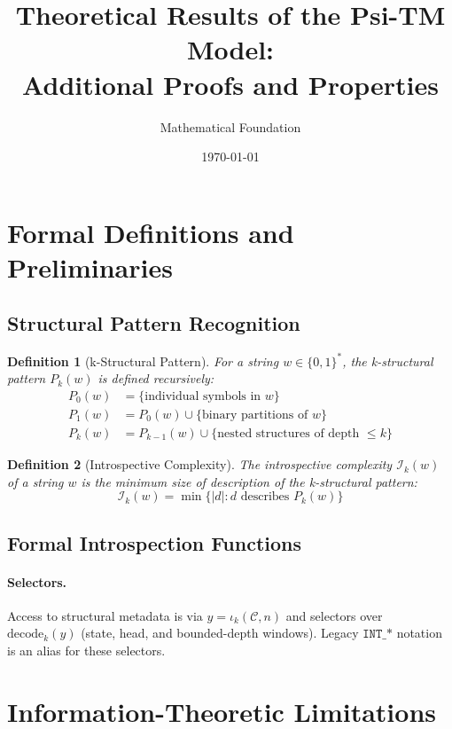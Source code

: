 \documentclass[11pt]{article}
\title{Theoretical Results of the Psi-TM Model:\\
Additional Proofs and Properties}
\author{Mathematical Foundation}
\date{\today}
\newtheorem{definition}{Definition}
\begin{document}
\maketitle

\section{Formal Definitions and Preliminaries}

\subsection{Structural Pattern Recognition}

\begin{definition}[k-Structural Pattern]
For a string $w \in \{0,1\}^*$, the k-structural pattern $P_k(w)$ is defined recursively:
\begin{align*}
P_0(w) &= \{\text{individual symbols in } w\} \\
P_1(w) &= P_0(w) \cup \{\text{binary partitions of } w\} \\
P_k(w) &= P_{k-1}(w) \cup \{\text{nested structures of depth } \leq k\}
\end{align*}
\end{definition}

\begin{definition}[Introspective Complexity]
The introspective complexity $\mathcal{I}_k(w)$ of a string $w$ is the minimum size of description of the k-structural pattern:
$$\mathcal{I}_k(w) = \min\{|d| : d \text{ describes } P_k(w)\}$$
\end{definition}

\subsection{Formal Introspection Functions}

\paragraph{Selectors.} Access to structural metadata is via $y=\iota_k(\mathcal{C},n)$ and selectors over $\mathrm{decode}_k(y)$ (state, head, and bounded-depth windows). Legacy $\texttt{INT\_*}$ notation is an alias for these selectors.

\section{Information-Theoretic Limitations}
\end{document}
